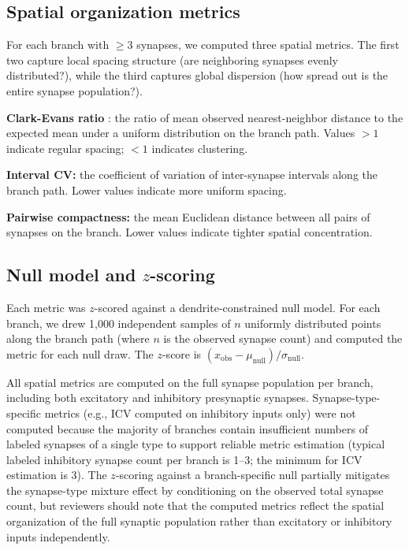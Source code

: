 \documentclass[11pt]{article}
\begin{document}
\subsection{Spatial organization metrics}

For each branch with $\geq 3$ synapses, we computed three spatial metrics. The first two capture local spacing structure (are neighboring synapses evenly distributed?), while the third captures global dispersion (how spread out is the entire synapse population?).

\textbf{Clark-Evans ratio} \citep{clark1954}: the ratio of mean observed nearest-neighbor distance to the expected mean under a uniform distribution on the branch path. Values $> 1$ indicate regular spacing; $< 1$ indicates clustering.

\textbf{Interval CV:} the coefficient of variation of inter-synapse intervals along the branch path. Lower values indicate more uniform spacing.

\textbf{Pairwise compactness:} the mean Euclidean distance between all pairs of synapses on the branch. Lower values indicate tighter spatial concentration.

\subsection{Null model and $z$-scoring}

Each metric was $z$-scored against a dendrite-constrained null model. For each branch, we drew 1,000 independent samples of $n$ uniformly distributed points along the branch path (where $n$ is the observed synapse count) and computed the metric for each null draw. The $z$-score is $(x_{\text{obs}} - \mu_{\text{null}}) / \sigma_{\text{null}}$.

All spatial metrics are computed on the full synapse population per branch, including both excitatory and inhibitory presynaptic synapses. Synapse-type-specific metrics (e.g., ICV computed on inhibitory inputs only) were not computed because the majority of branches contain insufficient numbers of labeled synapses of a single type to support reliable metric estimation (typical labeled inhibitory synapse count per branch is 1--3; the minimum for ICV estimation is 3). The $z$-scoring against a branch-specific null partially mitigates the synapse-type mixture effect by conditioning on the observed total synapse count, but reviewers should note that the computed metrics reflect the spatial organization of the full synaptic population rather than excitatory or inhibitory inputs independently.
\end{document}
